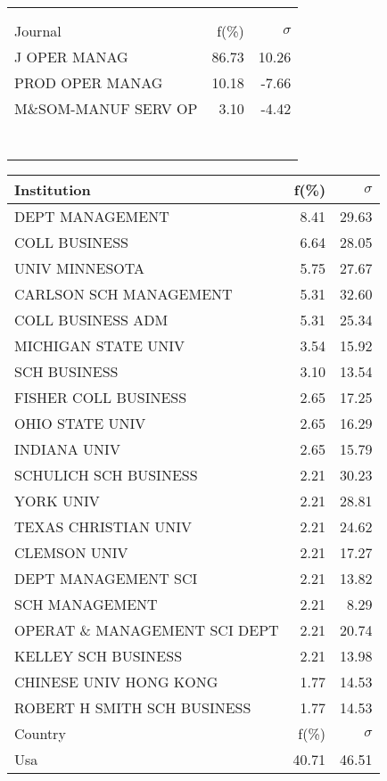 \documentclass[a4paper,11pt]{report}
\begin{document}
\begin{landscape}
\begin{table}[!ht]
{\begin{tabular}{|l r  r|}
 &  & \\
 &  & \\
\hline
\hline
Journal & f(\%) & $\sigma$\\
\hline
J OPER MANAG & 86.73 & 10.26\\
PROD OPER MANAG & 10.18 & -7.66\\
M\&SOM-MANUF SERV OP & 3.10 & -4.42\\
 &  & \\
 &  & \\
 &  & \\
 &  & \\
 &  & \\
 &  & \\
 &  & \\
\hline
\end{tabular}
}
{\scriptsize\begin{tabular}{|l r r|}
\hline
Institution & f(\%) & $\sigma$\\
\hline
DEPT MANAGEMENT & 8.41 & 29.63\\
COLL BUSINESS & 6.64 & 28.05\\
UNIV MINNESOTA & 5.75 & 27.67\\
CARLSON SCH MANAGEMENT & 5.31 & 32.60\\
COLL BUSINESS ADM & 5.31 & 25.34\\
MICHIGAN STATE UNIV & 3.54 & 15.92\\
SCH BUSINESS & 3.10 & 13.54\\
FISHER COLL BUSINESS & 2.65 & 17.25\\
OHIO STATE UNIV & 2.65 & 16.29\\
INDIANA UNIV & 2.65 & 15.79\\
SCHULICH SCH BUSINESS & 2.21 & 30.23\\
YORK UNIV & 2.21 & 28.81\\
TEXAS CHRISTIAN UNIV & 2.21 & 24.62\\
CLEMSON UNIV & 2.21 & 17.27\\
DEPT MANAGEMENT SCI & 2.21 & 13.82\\
SCH MANAGEMENT & 2.21 & 8.29\\
OPERAT \& MANAGEMENT SCI DEPT & 2.21 & 20.74\\
KELLEY SCH BUSINESS & 2.21 & 13.98\\
CHINESE UNIV HONG KONG & 1.77 & 14.53\\
ROBERT H SMITH SCH BUSINESS & 1.77 & 14.53\\
\hline
\hline
Country & f(\%) & $\sigma$\\
\hline
Usa & 40.71 & 46.51\\

\end{tabular}}
\end{table}
\end{landscape}
\end{document}
